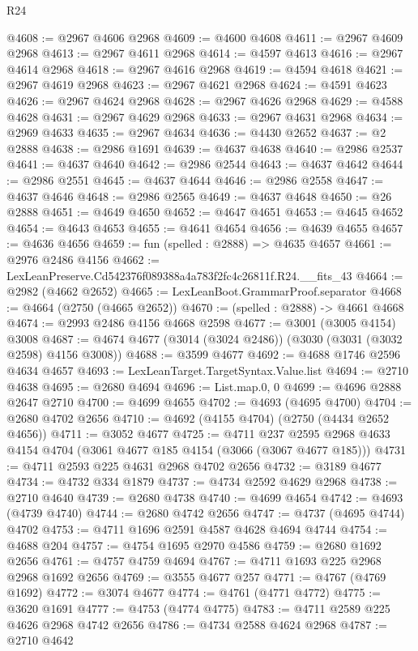 \begin{lexlean}{R24}
\begin{coremodule}
@4608 := @2967 @4606 @2968
@4609 := @4600 @4608
@4611 := @2967 @4609 @2968
@4613 := @2967 @4611 @2968
@4614 := @4597 @4613
@4616 := @2967 @4614 @2968
@4618 := @2967 @4616 @2968
@4619 := @4594 @4618
@4621 := @2967 @4619 @2968
@4623 := @2967 @4621 @2968
@4624 := @4591 @4623
@4626 := @2967 @4624 @2968
@4628 := @2967 @4626 @2968
@4629 := @4588 @4628
@4631 := @2967 @4629 @2968
@4633 := @2967 @4631 @2968
@4634 := @2969 @4633
@4635 := @2967 @4634
@4636 := @4430 @2652
@4637 := @2 @2888
@4638 := @2986 @1691
@4639 := @4637 @4638
@4640 := @2986 @2537
@4641 := @4637 @4640
@4642 := @2986 @2544
@4643 := @4637 @4642
@4644 := @2986 @2551
@4645 := @4637 @4644
@4646 := @2986 @2558
@4647 := @4637 @4646
@4648 := @2986 @2565
@4649 := @4637 @4648
@4650 := @26 @2888
@4651 := @4649 @4650
@4652 := @4647 @4651
@4653 := @4645 @4652
@4654 := @4643 @4653
@4655 := @4641 @4654
@4656 := @4639 @4655
@4657 := @4636 @4656
@4659 := fun (spelled : @2888) => @4635 @4657
@4661 := @2976 @2486 @4156
@4662 := LexLeanPreserve.Cd542376f089388a4a783f2fc4c26811f.R24.__fits_43
@4664 := @2982 (@4662 @2652)
@4665 := LexLeanBoot.GrammarProof.separator
@4668 := @4664 (@2750 (@4665 @2652))
@4670 := (spelled : @2888) -> @4661 @4668
@4674 := @2993 @2486 @4156 @4668 @2598
@4677 := @3001 (@3005 @4154) @3008
@4687 := @4674 @4677 (@3014 (@3024 @2486)) (@3030 (@3031 (@3032 @2598) @4156 @3008))
@4688 := @3599 @4677
@4692 := @4688 @1746 @2596 @4634 @4657
@4693 := LexLeanTarget.TargetSyntax.Value.list
@4694 := @2710 @4638
@4695 := @2680 @4694
@4696 := List.map.{0, 0}
@4699 := @4696 @2888 @2647 @2710
@4700 := @4699 @4655
@4702 := @4693 (@4695 @4700)
@4704 := @2680 @4702 @2656
@4710 := @4692 (@4155 @4704) (@2750 (@4434 @2652 @4656))
@4711 := @3052 @4677
@4725 := @4711
    @237
    @2595
    @2968
    @4633
    @4154
    @4704
    (@3061 @4677 @185 @4154 (@3066 (@3067 @4677 @185)))
@4731 := @4711 @2593 @225 @4631 @2968 @4702 @2656
@4732 := @3189 @4677
@4734 := @4732 @334 @1879
@4737 := @4734 @2592 @4629 @2968
@4738 := @2710 @4640
@4739 := @2680 @4738
@4740 := @4699 @4654
@4742 := @4693 (@4739 @4740)
@4744 := @2680 @4742 @2656
@4747 := @4737 (@4695 @4744) @4702
@4753 := @4711 @1696 @2591 @4587 @4628 @4694 @4744
@4754 := @4688 @204
@4757 := @4754 @1695 @2970 @4586
@4759 := @2680 @1692 @2656
@4761 := @4757 @4759 @4694
@4767 := @4711 @1693 @225 @2968 @2968 @1692 @2656
@4769 := @3555 @4677 @257
@4771 := @4767 (@4769 @1692)
@4772 := @3074 @4677
@4774 := @4761 (@4771 @4772)
@4775 := @3620 @1691
@4777 := @4753 (@4774 @4775)
@4783 := @4711 @2589 @225 @4626 @2968 @4742 @2656
@4786 := @4734 @2588 @4624 @2968
@4787 := @2710 @4642

\end{coremodule}
\end{lexlean}
